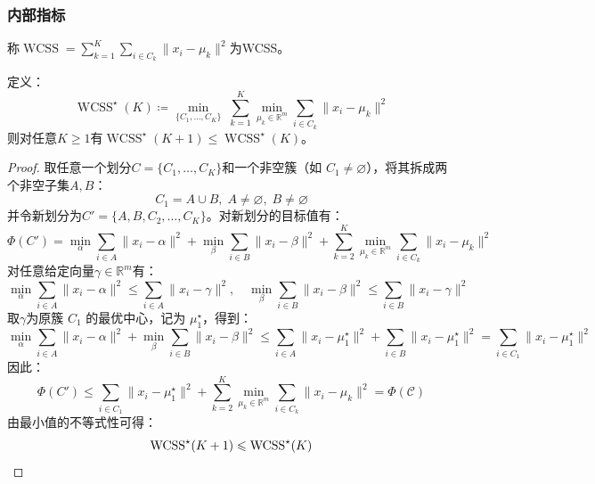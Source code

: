 \subsubsection{内部指标}
\begin{definition}
	称$\operatorname{WCSS}=\sum\limits_{k=1}^{K}\sum\limits_{i\in C_k}\|x_i-\mu_k\|^2$为\gls{WCSS}。
\end{definition}
\begin{property}[最优WCSS关于簇数的单调性]\label{prop:WCSSMonotonicity}
	定义：
	\begin{equation*}
		\operatorname{WCSS}^\star(K)\coloneq\min_{\{C_1,\dots,C_K\}}\;\sum_{k=1}^K \min_{\mu_k\in\mathbb{R}^m}\sum_{i\in C_k}\|x_i-\mu_k\|^2
	\end{equation*}
	则对任意$K\geqslant1$有$\operatorname{WCSS}^\star(K+1)\leqslant \operatorname{WCSS}^\star(K)$。
\end{property}
\begin{proof}
	取任意一个划分$C=\{C_1,\dots,C_K\}$和一个非空簇（如 $C_1\ne\varnothing$），将其拆成两个非空子集$A,B$：
	\begin{equation*}
		C_1=A\cup B,\;A\ne\varnothing,\;B\ne\varnothing
	\end{equation*}
	并令新划分为$C'=\{A,B,C_2,\dots,C_K\}$。对新划分的目标值有：
	\begin{equation*}
		\Phi(C')
		= \min_{\alpha}\sum_{i\in A}\|x_i-\alpha\|^2
		+\min_{\beta}\sum_{i\in B}\|x_i-\beta\|^2
		+\sum_{k=2}^K \min_{\mu_k\in\mathbb{R}^{m}}\sum_{i\in C_k}\|x_i-\mu_k\|^2
	\end{equation*}
	对任意给定向量$\gamma\in\mathbb{R}^m$有：
	\begin{equation*}
		\min_{\alpha}\sum_{i\in A}\|x_i-\alpha\|^2 \leqslant\sum_{i\in A}\|x_i-\gamma\|^2,\quad
		\min_{\beta}\sum_{i\in B}\|x_i-\beta\|^2 \leqslant\sum_{i\in B}\|x_i-\gamma\|^2
	\end{equation*}
	取$\gamma$为原簇 $C_1$ 的最优中心，记为 $\mu_1^\star$，得到：
	\begin{equation*}
		\min_{\alpha}\sum_{i\in A}\|x_i-\alpha\|^2
		+\min_{\beta}\sum_{i\in B}\|x_i-\beta\|^2
		\leqslant
		\sum_{i\in A}\|x_i-\mu_1^\star\|^2 + \sum_{i\in B}\|x_i-\mu_1^\star\|^2
		=
		\sum_{i\in C_1}\|x_i-\mu_1^\star\|^2
	\end{equation*}
	因此：
	\begin{equation*}
		\Phi(C')\leqslant
		\sum_{i\in C_1}\|x_i-\mu_1^\star\|^2
		+\sum_{k=2}^K \min_{\mu_k\in\mathbb{R}^{m}}\sum_{i\in C_k}\|x_i-\mu_k\|^2
		= \Phi(\mathcal{C})
	\end{equation*}
	由最小值的不等式性可得：
	\begin{equation*}
		\operatorname{WCSS}^\star(K+1)\leqslant\operatorname{WCSS}^\star(K)\qedhere
	\end{equation*}
\end{proof}
